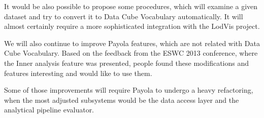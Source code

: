 It would be also possible to propose some procedures, which will examine a given 
dataset and try to convert it to Data Cube Vocabulary automatically. It will 
almost certainly require a more sophisticated integration with the LodVis 
project.

We will also continue to improve Payola features, which are not related with 
Data Cube Vocabulary. Based on the feedback from the ESWC 2013 conference, where the 
Inner analysis feature was presented, people found these modifications and 
features interesting and would like to use them.

Some of those improvements will require Payola to undergo a heavy refactoring, 
when the most adjusted subsystems would be the data access layer and the analytical 
pipeline evaluator.

